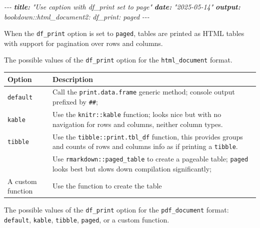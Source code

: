 \documentclass[
  a4paper,
  twoside,
  openright]{book}
\newenvironment{Shaded}{\begin{snugshade}}{\end{snugshade}}
\newcommand{\AnnotationTok}[1]{\textcolor[rgb]{0.56,0.35,0.01}{\textbf{\textit{#1}}}}
\newcommand{\CommentTok}[1]{\textcolor[rgb]{0.56,0.35,0.01}{\textit{#1}}}
\theoremstyle{definition}
\theoremstyle{definition}
\theoremstyle{definition}
\theoremstyle{definition}
\theoremstyle{remark}
\begin{document}
\begin{Shaded}
\begin{Highlighting}[]
\CommentTok{{-}{-}{-}}
\AnnotationTok{title:}\CommentTok{ "Use caption with df\_print set to page"}
\AnnotationTok{date:}\CommentTok{ "2025{-}05{-}14"}
\AnnotationTok{output:}
\CommentTok{  bookdown::html\_document2:}
\CommentTok{    df\_print: paged}
\CommentTok{{-}{-}{-}}
\end{Highlighting}
\end{Shaded}

When the \texttt{df\_print} option is set to \texttt{paged}, tables are printed as HTML tables with support for pagination over rows and columns.

The possible values of the \texttt{df\_print} option for the \texttt{html\_document} format.

\begin{longtable}[]{@{}
  >{\raggedright\arraybackslash}p{}
  >{\raggedright\arraybackslash}p{}@{}}
\toprule\noalign{}
\begin{minipage}[b]{\linewidth}\raggedright
Option
\end{minipage} & \begin{minipage}[b]{\linewidth}\raggedright
Description
\end{minipage} \\
\midrule\noalign{}
\endhead
\bottomrule\noalign{}
\endlastfoot
\texttt{default} & Call the \texttt{print.data.frame} generic method; console output prefixed by \texttt{\#\#}; \\
\texttt{kable} & Use the \texttt{knitr::kable} function; looks nice but with no navigation for rows and columns, neither column types. \\
\texttt{tibble} & Use the \texttt{tibble::print.tbl\_df} function, this provides groups and counts of rows and columns info as if printing a \texttt{tibble}. \\
{\texttt{paged}} & Use \texttt{rmarkdown::paged\_table} to create a pageable table; \texttt{paged} looks best but slows down compilation significantly; \\
A custom function & Use the function to create the table \\
\end{longtable}

The possible values of the \texttt{df\_print} option for the \texttt{pdf\_document} format: \texttt{default}, \texttt{kable}, \texttt{tibble}, \texttt{paged}, or a custom function.
\end{document}
